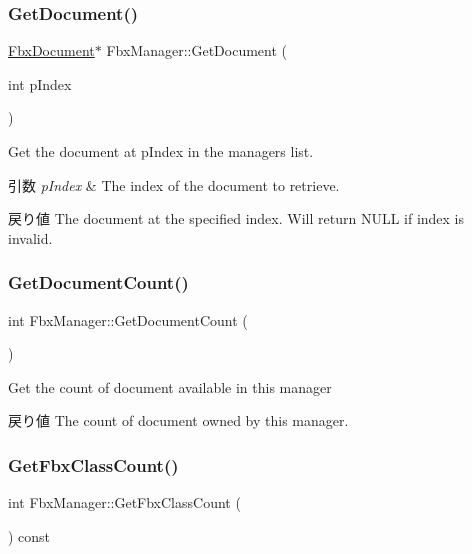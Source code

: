 \subsubsection{\texorpdfstring{Get\+Document()}{GetDocument()}}
{\footnotesize\ttfamily \hyperlink{class_fbx_document}{Fbx\+Document}$\ast$ Fbx\+Manager\+::\+Get\+Document (\begin{DoxyParamCaption}\item[{int}]{p\+Index }\end{DoxyParamCaption})}

Get the document at p\+Index in the manager\textquotesingle{}s list. 
\begin{DoxyParams}{引数}
{\em p\+Index} & The index of the document to retrieve. \\
\hline
\end{DoxyParams}
\begin{DoxyReturn}{戻り値}
The document at the specified index. Will return N\+U\+LL if index is invalid. 
\end{DoxyReturn}
\mbox{\label{class_fbx_manager_a989f88125a683f5c137e00cf126d53c6}} 
\subsubsection{\texorpdfstring{Get\+Document\+Count()}{GetDocumentCount()}}
{\footnotesize\ttfamily int Fbx\+Manager\+::\+Get\+Document\+Count (\begin{DoxyParamCaption}{ }\end{DoxyParamCaption})}

Get the count of document available in this manager \begin{DoxyReturn}{戻り値}
The count of document owned by this manager. 
\end{DoxyReturn}
\mbox{\label{class_fbx_manager_a402614ab76c557ac064ae8bbea28d119}} 
\subsubsection{\texorpdfstring{Get\+Fbx\+Class\+Count()}{GetFbxClassCount()}}
{\footnotesize\ttfamily int Fbx\+Manager\+::\+Get\+Fbx\+Class\+Count (\begin{DoxyParamCaption}{ }\end{DoxyParamCaption}) const}


